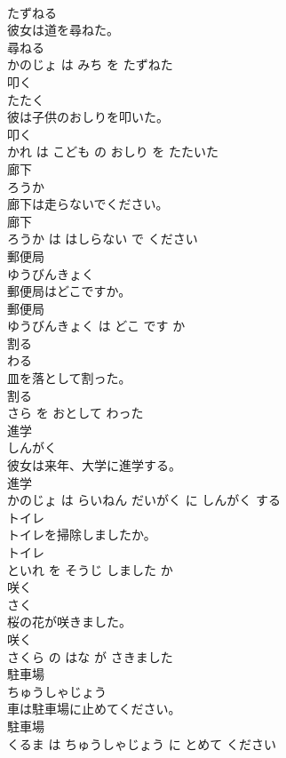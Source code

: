\documentclass[8pt]{extreport}
\begin{document}
\begin{CJK}{UTF8}{min}
\\	たずねる			
\\	彼女は道を尋ねた。	
\\	尋ねる 
\\	かのじょ は みち を たずねた			
\\	叩く	
\\	たたく			
\\	彼は子供のおしりを叩いた。	
\\	叩く 
\\	かれ は こども の おしり を たたいた			
\\	廊下	
\\	ろうか			
\\	廊下は走らないでください。	
\\	廊下 
\\	ろうか は はしらない で ください			
\\	郵便局	
\\	ゆうびんきょく			
\\	郵便局はどこですか。	
\\	郵便局 
\\	ゆうびんきょく は どこ です か			
\\	割る	
\\	わる			
\\	皿を落として割った。	
\\	割る 
\\	さら を おとして わった			
\\	進学	
\\	しんがく			
\\	彼女は来年、大学に進学する。	
\\	進学 
\\	かのじょ は らいねん だいがく に しんがく する			
\\	トイレ	
\\	トイレを掃除しましたか。	
\\	トイレ 
\\	といれ を そうじ しました か			
\\	咲く	
\\	さく			
\\	桜の花が咲きました。	
\\	咲く 
\\	さくら の はな が さきました			
\\	駐車場	
\\	ちゅうしゃじょう			
\\	車は駐車場に止めてください。	
\\	駐車場 
\\	くるま は ちゅうしゃじょう に とめて ください			

\end{CJK}
\end{document}
